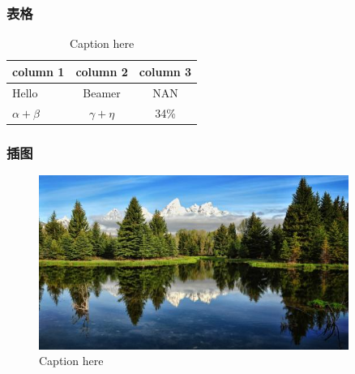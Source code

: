 \documentclass{beamer}
\begin{document}
	\begin{frame}[c] 	
		\frametitle{表格}
		\begin{table}[tb]
			\centering
			\caption{Caption here\label{tab:tablename}}
			\begin{tabular}{l|cc} \hline
				\textbf{column 1} & \textbf{column 2} & \textbf{column 3} \\ \hline
				Hello & Beamer & NAN \\ \hline
				$\alpha+\beta$ & $\gamma+\eta$ & 34\% \\ \hline
			\end{tabular}
		\end{table}
	\end{frame}

	\begin{frame}[c] 	
		\frametitle{插图}
		\begin{figure}[tb]
			\centering
			\includegraphics[width=0.9\textwidth]{image.jpg}
			\caption{Caption here\label{fig:figure1}}
		\end{figure}
	\end{frame}
\end{document}
